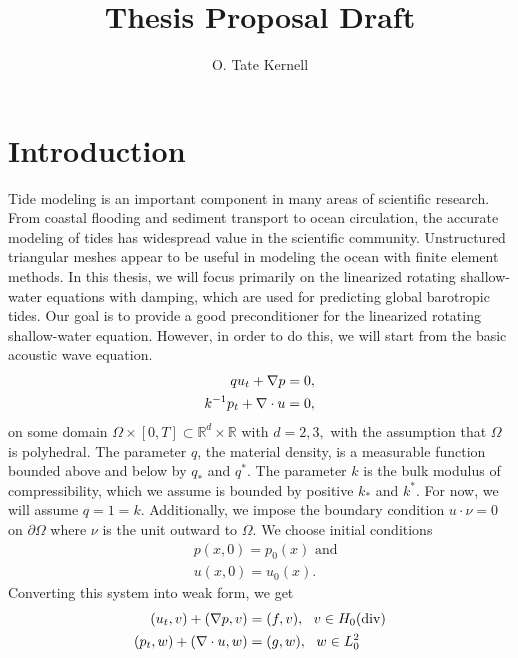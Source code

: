 \documentclass[11pt]{article}
\title{Thesis Proposal Draft}
\date{}
\author{O. Tate Kernell}
\newcommand{\R}{\mathbb{R}}
\newcommand{\divv}{\mathrm{div}}
\begin{document}
\maketitle

\section{Introduction}
Tide modeling is an important component in many areas of scientific research. From coastal flooding and sediment transport to ocean circulation, the accurate modeling of tides has widespread value in the scientific community. Unstructured triangular meshes appear to be useful in modeling the ocean with finite element methods. In this thesis, we will focus primarily on the linearized rotating shallow-water equations with damping, which are used for predicting global barotropic tides. Our goal is to provide a good preconditioner for the linearized rotating shallow-water equation. However, in order to do this, we will start from the basic acoustic wave equation.
\begin{equation}{\label{acouswave}}
\begin{split}
qu_t + \nabla p = 0, \\
k^{-1}p_t+ \nabla \cdot u = 0,
\end{split}
\end{equation}
on some domain $\Omega \times [0,T] \subset \R^d \times \R$ with $d = 2,3,$ with the assumption that $\Omega$ is polyhedral. The parameter $q$, the material density, is a measurable function bounded above and below by $q_*$ and $q^*$. The parameter $k$ is the bulk modulus of compressibility, which we assume is bounded by positive $k_*$ and $k^*$. For now, we will assume $q = 1 = k$. Additionally, we impose the boundary condition $u \cdot \nu = 0$ on $\partial\Omega$ where $\nu$ is the unit outward to $\Omega$. We choose initial conditions
\begin{equation}\label{initialconditions}
\begin{split}
&p(x,0) = p_0(x) \text{ and}\\
&u(x,0) = u_0(x).
\end{split}
\end{equation}
Converting this system into weak form, we get
\begin{equation}{\label{weakformacouswave}}
\begin{split}
(u_t,v) + (\nabla p,v) &= (f,v), \:\:\: v \in H_0(\divv) \\
(p_t, w) + (\nabla \cdot u,w) &= (g,w), \:\:\: w \in L_0^2
\end{split}
\end{equation}
\end{document}
